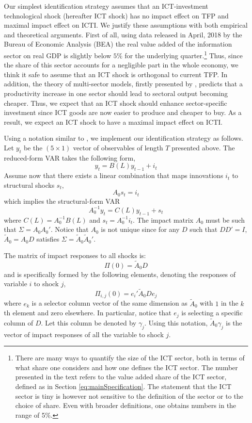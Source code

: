 \documentclass[12pt]{article}
\begin{document}
Our simplest identification strategy assumes that an ICT-investment technological shock (hereafter ICT shock) has no impact effect on TFP and maximal impact effect on ICTI. We justify these assumptions with both empirical and theoretical arguments. First of all, using data released in April, 2018 by the Bureau of Economic Analysis (BEA) the real value added of the information sector on real GDP is slightly below $5$\% for the underlying quarter.\footnote{There are many ways to quantify the size of the ICT sector, both in terms of what share one considers and how one defines the ICT sector. The number presented in the text refers to the value added share of the ICT sector, defined as in Section \ref{eq:mainSpecification}. The statement that the ICT sector is tiny is however not sensitive to the definition of the sector or to the choice of share. Even with broader definitions, one obtains numbers in the range of 5\%.} Thus, since the share of this sector accounts for a negligible part in the whole economy, we think it safe to assume that an ICT shock is orthogonal to current TFP. In addition, the theory of multi-sector models, firstly presented by \cite{greenwood1997long}, predicts that a productivity increase in one sector should lead to sectoral output becoming cheaper. Thus, we expect that an ICT shock should enhance sector-specific investment since ICT goods are now easier to produce and cheaper to buy. As a result, we expect an ICT shock to have a maximal impact effect on ICTI. 

Using a notation similar to \cite{barsky2011news}, we implement our identification strategy as follows. Let $y_t$ be the $(5 \times 1)$ vector of observables of length $T$ presented above. The reduced-form VAR takes the following form,
$$
y_t = B(L)y_{t-1} + i_t 
$$
Assume now that there exists a linear combination that maps innovations $i_t$ to structural shocks $s_t$,
$$
A_0 s_t = i_t
$$
which implies the structural-form VAR
$$
A_0^{-1}y_t = C(L) y_{t-1} + s_t
$$
where $C(L) = A_0^{-1} B(L)$ and $s_t = A_0^{-1} i_t$. The impact matrix $A_0$ must be such that $\Sigma = A_0 A_0'$. Notice that $A_0$ is not unique since for any $D$ such that $DD' = I$, $\tilde{A}_0 = A_0 D$ satisfies $\Sigma = \tilde{A}_0 \tilde{A}_0'$. 

The matrix of impact responses to all shocks is: %
$$
\Pi(0) = \tilde{A}_0 D
$$
and is specifically formed by the following elements, denoting the responses of variable $i$ to shock $j$, %
$$
\Pi_{i,j}(0) = e_i' \tilde{A}_0 D e_j
$$
where $e_k$ is a selector column vector of the same dimension as $\tilde{A}_0$ with $1$ in the $k$th element and zero elsewhere. In particular, notice that $e_j$ is selecting a specific column of $D$. Let this column be denoted by $\gamma_j$. Using this notation, $\tilde{A}_0\gamma_j$ is the vector of impact responses of all the variable to shock $j$.
\end{document}
